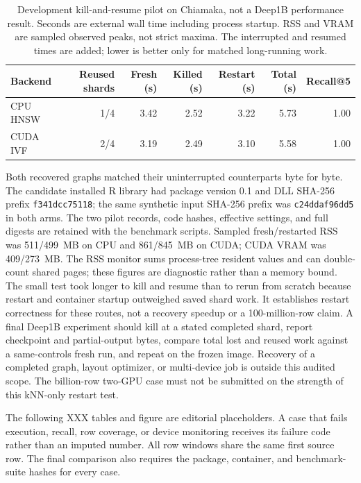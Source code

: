 \documentclass[article]{jss}
\begin{document}
\begin{table}[htbp]
\centering
\scriptsize
\caption{Development kill-and-resume pilot on Chiamaka, not a Deep1B
  performance result. Seconds are external wall time including process
  startup. RSS and VRAM are sampled observed peaks, not strict maxima.
  The interrupted and resumed times are added; lower is better only for
  matched long-running work.}
\label{tab:recovery-pilot}
\begin{tabular}{lrrrrrr}
\toprule
Backend & Reused shards & Fresh (s) & Killed (s) & Restart (s) &
  Total (s) & Recall@5 \\
\midrule
CPU HNSW & 1/4 & 3.42 & 2.52 & 3.22 & 5.73 & 1.00 \\
CUDA IVF & 2/4 & 3.19 & 2.49 & 3.10 & 5.58 & 1.00 \\
\bottomrule
\end{tabular}
\end{table}

Both recovered graphs matched their uninterrupted counterparts byte for
byte. The candidate installed R library had package version 0.1 and DLL
SHA-256 prefix \texttt{f341dcc75118}; the same synthetic input SHA-256
prefix was \texttt{c24ddaf96dd5} in both arms. The two pilot records,
code hashes, effective settings, and full digests are retained with the
benchmark scripts. Sampled fresh/restarted RSS was 511/499~MB on CPU
and 861/845~MB on CUDA; CUDA VRAM was 409/273~MB.
The RSS monitor sums process-tree resident values and can double-count
shared pages; these figures are diagnostic rather than a memory bound.
The small test took
longer to kill and resume than to rerun from scratch because restart and
container startup outweighed saved shard work. It establishes restart
correctness for these routes, not a recovery speedup or a 100-million-row
claim. A final Deep1B experiment should kill at a stated completed shard,
report checkpoint and partial-output bytes, compare total lost and reused
work against a same-controls fresh run, and repeat on the frozen image.
Recovery of a completed graph, layout optimizer, or multi-device job is
outside this audited scope. The billion-row two-GPU case must not be
submitted on the strength of this kNN-only restart test.

The following XXX tables and figure are editorial placeholders. A case
that fails execution, recall, row coverage, or device monitoring receives
its failure code rather than an imputed number. All row windows share the
same first source row. The final comparison also requires the package,
container, and benchmark-suite hashes for every case.
\end{document}
